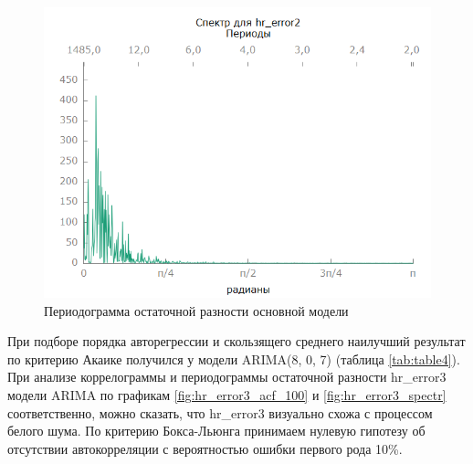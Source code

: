 \documentclass[a4paper,12pt]{article}
\begin{document}
\begin{figure}[H]
	\centering
	\includegraphics[width=0.5\linewidth]{../[graphics]/hr_error2_spectr.png}
	\caption{Периодограмма остаточной разности основной модели}
	\label{fig:hr_error2_spectr}
\end{figure}

При подборе порядка авторегрессии и скользящего среднего наилучший результат по критерию Акаике получился у модели ARIMA(8, 0, 7) (таблица \ref{tab:table4}). При анализе коррелограммы и периодограммы остаточной разности hr\_error3 модели ARIMA по графикам \ref{fig:hr_error3_acf_100} и \ref{fig:hr_error3_spectr} соответственно, можно сказать, что hr\_error3 визуально схожа с процессом белого шума. По критерию Бокса-Льюнга принимаем нулевую гипотезу об отсутствии автокорреляции с вероятностью ошибки первого рода 10\%.
\end{document}
